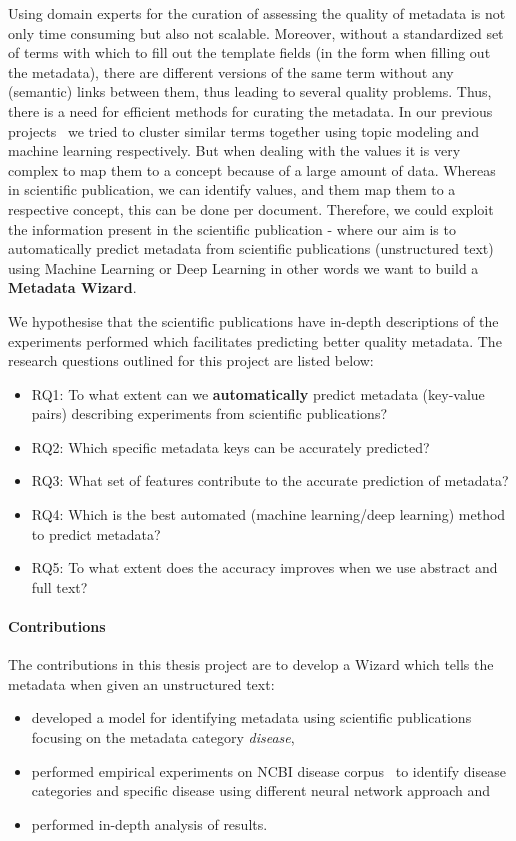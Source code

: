 Using domain experts for the curation of assessing the quality of metadata is not only time consuming but also not scalable. 
Moreover, without a standardized set of terms with which to fill out the template fields (in the form when filling out the metadata), there are different versions of the same term without any (semantic) links between them, thus leading to several quality problems. Thus, there is a need for  efficient methods for curating the metadata. In our previous projects~\cite{nayak2018quality, nayak2018ML} we tried to cluster similar terms together using topic modeling and machine learning respectively. But when dealing with the values it is very complex to map them to a concept because of a large amount of data. Whereas in scientific publication, we can identify values, and them map them to a respective concept, this can be done per document. Therefore, we could exploit the information present in the scientific publication - where our aim is to automatically predict metadata from scientific publications (unstructured text) using Machine Learning or Deep Learning in other words we want to build a \textbf{Metadata Wizard}.

We hypothesise that the scientific publications have in-depth descriptions of the experiments performed which facilitates predicting better quality metadata. 
The research questions outlined for this project are listed below:
\begin{itemize}
    \item RQ1: To what extent can we \textbf{automatically} predict metadata (key-value pairs) describing experiments from scientific publications?%
    \item RQ2: Which specific metadata keys can be accurately predicted?
    \item RQ3: What set of features contribute to the accurate prediction of metadata?
    \item RQ4: Which is the best automated (machine learning/deep learning) method to predict metadata?
    \item RQ5: To what extent does the accuracy improves when we use abstract and full text?
\end{itemize}

\paragraph{Contributions} 
The contributions in this thesis project are to develop a Wizard which tells the metadata when given an unstructured text:
\begin{itemize}
\item  developed a model for identifying metadata using scientific publications focusing on the metadata category \emph{disease}, 
\item  performed empirical experiments on NCBI disease corpus~\cite{dougan2014ncbi} to identify disease categories and specific disease using different neural network approach and \item performed in-depth analysis of results. 
\end{itemize}


